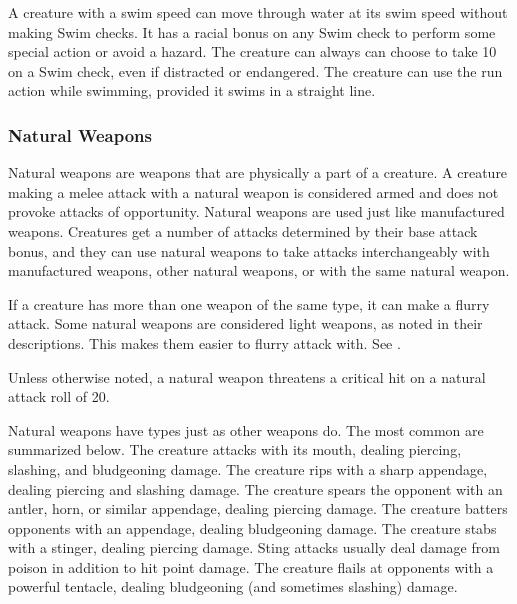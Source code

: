  A creature with a swim speed can move through water at its swim speed without making Swim checks. It has a  racial bonus on any Swim check to perform some special action or avoid a hazard. The creature can always can choose to take 10 on a Swim check, even if distracted or endangered. The creature can use the run action while swimming, provided it swims in a straight line. 

\subsubsection{Natural Weapons} Natural weapons are weapons that are physically a part of a creature. A creature making a melee attack with a natural weapon is considered armed and does not provoke attacks of opportunity. Natural weapons are used just like manufactured weapons. Creatures get a number of attacks determined by their base attack bonus, and they can use natural weapons to take attacks interchangeably with manufactured weapons, other natural weapons, or with the same natural weapon.

If a creature has more than one weapon of the same type, it can make a flurry attack. Some natural weapons are considered light weapons, as noted in their descriptions. This makes them easier to flurry attack with. See .

Unless otherwise noted, a natural weapon threatens a critical hit on a natural attack roll of 20.

Natural weapons have types just as other weapons do. The most common are summarized below.
 The creature attacks with its mouth, dealing piercing, slashing, and bludgeoning damage.
 The creature rips with a sharp appendage, dealing piercing and slashing damage.
 The creature spears the opponent with an antler, horn, or similar appendage, dealing piercing damage.
 The creature batters opponents with an appendage, dealing bludgeoning damage.
 The creature stabs with a stinger, dealing piercing damage. Sting attacks usually deal damage from poison in addition to hit point damage.
 The creature flails at opponents with a powerful tentacle, dealing bludgeoning (and sometimes slashing) damage. 

